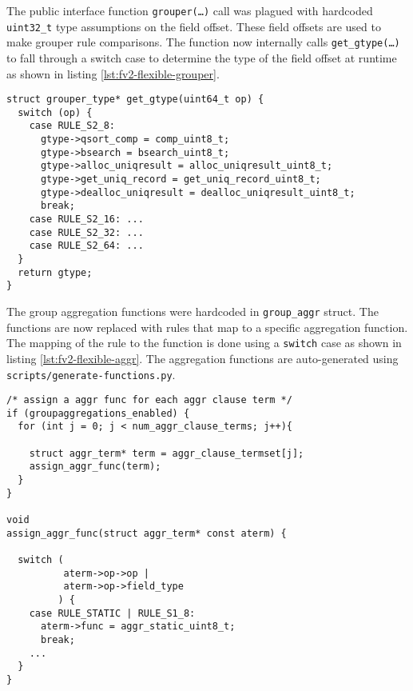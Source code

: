 The public interface function \texttt{grouper(\ldots)} call was plagued with
hardcoded \texttt{uint32\_t} type assumptions on the field offset. These field
offsets  are used to
make grouper rule comparisons. The function now internally calls
\texttt{get\_gtype(\ldots)} to fall through a switch case to determine the
type of the field offset at runtime as shown in listing
\ref{lst:fv2-flexible-grouper}.

\begin{lstlisting}
struct grouper_type* get_gtype(uint64_t op) {
  switch (op) {
    case RULE_S2_8:
      gtype->qsort_comp = comp_uint8_t;
      gtype->bsearch = bsearch_uint8_t;
      gtype->alloc_uniqresult = alloc_uniqresult_uint8_t;
      gtype->get_uniq_record = get_uniq_record_uint8_t;
      gtype->dealloc_uniqresult = dealloc_uniqresult_uint8_t;
      break;
    case RULE_S2_16: ...
    case RULE_S2_32: ...
    case RULE_S2_64: ...
  }
  return gtype;
}
\end{lstlisting}



The group aggregation functions were hardcoded in \texttt{group\_aggr}
struct.  The functions are now replaced with rules that map to a specific
aggregation function.  The mapping of
the rule to the function is done using a \texttt{switch} case as shown in
listing \ref{lst:fv2-flexible-aggr}. The aggregation functions are
auto-generated using \texttt{scripts/generate-functions.py}.

\begin{lstlisting}
/* assign a aggr func for each aggr clause term */
if (groupaggregations_enabled) {
  for (int j = 0; j < num_aggr_clause_terms; j++){

    struct aggr_term* term = aggr_clause_termset[j];
    assign_aggr_func(term);
  }
}

void
assign_aggr_func(struct aggr_term* const aterm) {

  switch (
          aterm->op->op |
          aterm->op->field_type
         ) {
    case RULE_STATIC | RULE_S1_8:
      aterm->func = aggr_static_uint8_t;
      break;
    ...
  }
}
\end{lstlisting}

